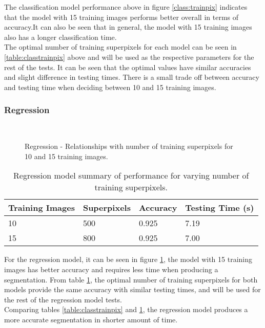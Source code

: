 The classification model performance above in figure \ref{class:trainpix} indicates that the model with 15 training images performs better overall in terms of accuracy.It can also be seen that in general, the model with 15 training images also has a longer classification time.
\\[1\baselineskip]
The optimal number of training superpixels for each model can be seen in \ref{table:classtrainpix} above and will be used as the respective parameters for the rest of the tests. It can be seen that the optimal values have similar accuracies and slight difference in testing times. There is a small trade off between accuracy and testing time when deciding between 10 and 15 training images.


\subsubsection{Regression}
\begin{figure}[H]
    \centering
    \\
    \caption{Regression - Relationships with number of training superpixels for 10 and 15 training images.}%
    \label{reg:trainpix}
\end{figure}

\begin{table}[H]
\centering
\caption{Regression model summary of performance for varying number of training superpixels.}

\begin{tabular}{|l|l|l|l|}
\hline
 \textbf{Training Images} &	\textbf{Superpixels} & \textbf{Accuracy} & \textbf{Testing Time (s)}\\
\hline
10 & 500 & 0.925 & 7.19\\
\hline				    	 			
15 & 800 & 0.925& 7.00\\	
\hline		    	 
\end{tabular}
\label{table:regtrainpix}
\end{table}

For the regression model, it can be seen in figure \ref{reg:trainpix}, the model with 15 training images has better accuracy and requires less time when producing a segmentation. From table \ref{table:regtrainpix}, the optimal number of training superpixels for both models provide the same accuracy with similar testing times, and will be used for the rest of the regression model tests.
\\[1\baselineskip]
 Comparing tables \ref{table:classtrainpix} and \ref{table:regtrainpix}, the regression model produces a more accurate segmentation in shorter amount of time. 

